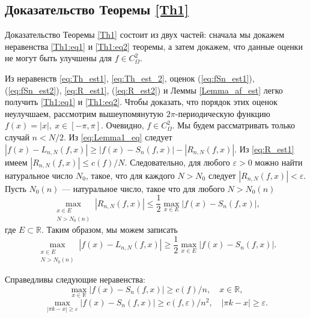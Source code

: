 \subsection{Доказательство Теоремы \ref{Th1}}
Доказательство Теоремы \ref{Th1} состоит из двух частей: сначала мы докажем неравенства \eqref{Th1:eq1} и \eqref{Th1:eq2} теоремы, а затем докажем, что данные оценки не могут быть улучшены для $f \in C_{\Omega}^{2}$. 	

Из неравенств \eqref{eq:Th_est1}, \eqref{eq:Th_est_2}, оценок
(\ref{eq:fSn_est1}), (\ref{eq:fSn_est2}), %
\eqref{eq:R_est1}, (\ref{eq:R_est2}) %
и Леммы \ref{Lemma_af_est} легко получить \eqref{Th1:eq1} и \eqref{Th1:eq2}.
Чтобы доказать, что порядок этих оценок неулучшаем, рассмотрим вышеупомянутую $2\pi$-периодическую функцию
$f(x) = |x|,\ x \in [-\pi,\pi]$. 
Очевидно, $f \in C_{\Omega}^{2}$. 
Мы будем рассматривать только случай $n < N/2$.	
Из \eqref{eq:Lemma1_eq} следует
$
\left|f(x) - L_{n,N}(f,x)\right| \geq \left|f(x) - S_n(f,x)\right| - \left|R_{n,N}(f,x)\right|.
$
Из \eqref{eq:R_est1} имеем $\left|R_{n,N}(f,x)\right| \leq c(f)/N$. Следовательно, для любого $\varepsilon > 0$
можно найти натуральное число $N_0$, такое, что для каждого $N > N_0$ следует $\left|R_{n,N}(f,x)\right| < \varepsilon$. 
Пусть $N_0(n)$ --- натуральное число, такое что для любого $N > N_0(n)$  
$$
\max_{\substack{x \in E \\ N > N_0(n)}} \left|R_{n,N}(f,x)\right| \leq \frac12 \max_{x \in E} \left|f(x) - S_{n}(f,x)\right|,
$$
где $E \subset \mathbb{R}$.
Таким образом, мы можем записать
\begin{equation} \label{maxLgeqmaxRn}
\max_{\substack{x \in E \\ N > N_0(n)}}\left|f(x) - L_{n,N}(f,x)\right| \geq \frac12 \max_{x \in E}\left|f(x) - S_n(f,x)\right|.
\end{equation}
\begin{lemma}
	Справедливы следующие неравенства:
	$$
	\max_{x \in \mathbb{R}}\left|f(x) - S_n(f,x)\right| \geq {c(f)}/{n},\quad x \in \mathbb{R},
	$$
	$$
	\max_{\left|\pi k - x\right| \geq \varepsilon} \left|f(x) - S_n(f,x)\right| \geq {c(f, \varepsilon)}/{n^2},\quad \left|\pi k - x\right| \geq \varepsilon.
	$$
\end{lemma}
